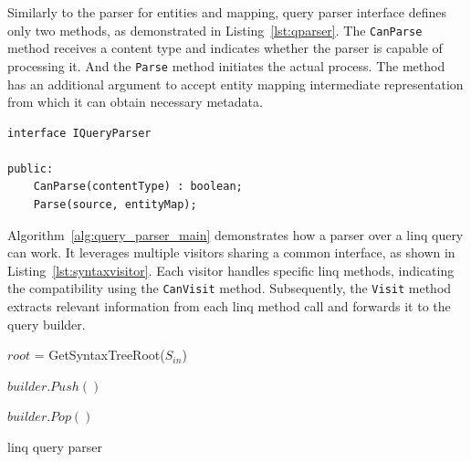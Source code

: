 Similarly to the parser for entities and mapping, query parser interface defines only two methods, as demonstrated in Listing~\ref{lst:qparser}. The \texttt{CanParse} method receives a content type and indicates whether the parser is capable of processing it. And the \texttt{Parse} method initiates the actual process. The method has an additional argument to accept entity mapping intermediate representation from which it can obtain necessary metadata.  

 \begin{lstlisting}[caption={IQueryParser interface structure}, language=pseudo, label={lst:qparser}]
interface IQueryParser

public:
    CanParse(contentType) : boolean;
    Parse(source, entityMap);
 \end{lstlisting}

Algorithm~\ref{alg:query_parser_main} demonstrates how a parser over a \acrshort{linq} query can work. It leverages multiple visitors sharing a common interface, as shown in Listing~\ref{lst:syntaxvisitor}. Each visitor handles specific \acrshort{linq} methods, indicating the compatibility using the \texttt{CanVisit} method. Subsequently, the \texttt{Visit} method extracts relevant information from each \acrshort{linq} method call and forwards it to the query builder.

\begin{algorithm}[!htp]
    \footnotesize
    \DontPrintSemicolon


    
    $root$ = GetSyntaxTreeRoot($S_{in}$)\;

    $builder.Push()$\;

    \BlankLine
    $builder.Pop()$\;
    
    \caption{\acrshort{linq} query parser}
    \label{alg:query_parser_main}
\end{algorithm}

